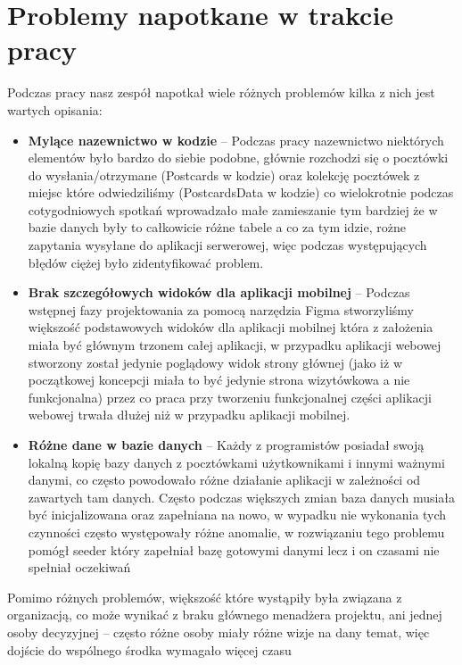 \documentclass[a4paper,twoside,12pt]{book}
\begin{document}
\section{Problemy napotkane w trakcie pracy}
Podczas pracy nasz zespół napotkał wiele różnych problemów kilka z nich jest wartych opisania:
\begin{itemize}
    \item \textbf{Mylące nazewnictwo w kodzie} -- Podczas pracy nazewnictwo niektórych elementów było bardzo do siebie podobne, głównie rozchodzi się o pocztówki do wysłania/otrzymane (Postcards w kodzie) oraz kolekcję pocztówek z miejsc które odwiedziliśmy (PostcardsData w kodzie) co wielokrotnie podczas cotygodniowych spotkań wprowadzało małe zamieszanie tym bardziej że w bazie danych były to całkowicie różne tabele a co za tym idzie, rożne zapytania wysyłane do aplikacji serwerowej, więc podczas występujących błędów ciężej było zidentyfikować problem.
    \item \textbf{Brak szczegółowych widoków dla aplikacji mobilnej} -- Podczas wstępnej fazy projektowania za pomocą narzędzia Figma stworzyliśmy większość podstawowych widoków dla aplikacji mobilnej która z założenia miała być głównym trzonem całej aplikacji, w przypadku aplikacji webowej stworzony został jedynie poglądowy widok strony głównej (jako iż w początkowej koncepcji miała to być jedynie strona wizytówkowa a nie funkcjonalna) przez co praca przy tworzeniu funkcjonalnej części aplikacji webowej trwała dłużej niż w przypadku aplikacji mobilnej.
    \item \textbf{Różne dane w bazie danych} -- Każdy z programistów posiadał swoją lokalną kopię bazy danych z pocztówkami użytkownikami i innymi ważnymi danymi, co często powodowało różne działanie aplikacji w zależności od zawartych tam danych. Często podczas większych zmian baza danych musiała być inicjalizowana oraz zapełniana na nowo, w wypadku nie wykonania tych czynności często występowały różne anomalie, w rozwiązaniu tego problemu pomógł seeder który zapełniał bazę gotowymi danymi lecz i on czasami nie spełniał oczekiwań
\end{itemize}
Pomimo różnych problemów, większość które wystąpiły była związana z organizacją, co może wynikać z braku głównego menadżera projektu, ani jednej osoby decyzyjnej -- często różne osoby miały różne wizje na dany temat, więc dojście do wspólnego środka wymagało więcej czasu

\newpage
\end{document}
